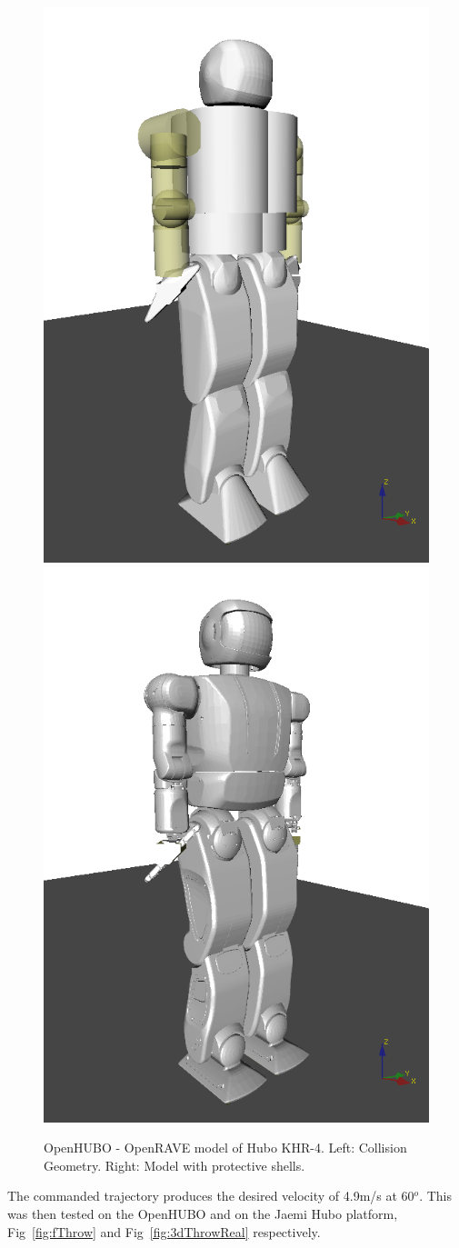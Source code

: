 \begin{figure}[ht]
  \centering
\includegraphics[width=0.5\columnwidth]{./pix/hCol.png}\includegraphics[width=0.5\columnwidth]{./pix/hBody.png}
  \caption{OpenHUBO - OpenRAVE model of Hubo KHR-4.  Left: Collision Geometry.  Right: Model with protective shells\cite{dlofaro-srm}.  }
  \label{fig:vHubo}
\end{figure}

The commanded trajectory produces the desired velocity of 4.9m/s at 60$^o$.  This was then tested on the OpenHUBO and on the Jaemi Hubo platform, Fig~\ref{fig:fThrow} and Fig~\ref{fig:3dThrowReal} respectively.




